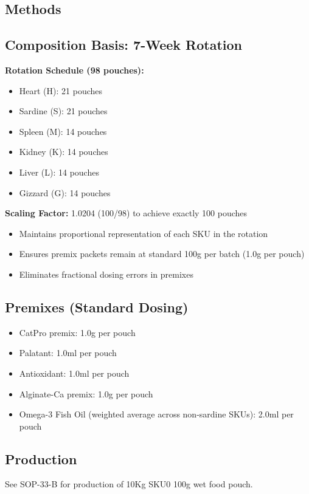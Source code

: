\subsection*{Methods}

\subsection*{Composition Basis: 7-Week Rotation}

\textbf{Rotation Schedule (98 pouches):}
\begin{itemize}
\item Heart (H): 21 pouches
\item Sardine (S): 21 pouches
\item Spleen (M): 14 pouches
\item Kidney (K): 14 pouches
\item Liver (L): 14 pouches
\item Gizzard (G): 14 pouches
\end{itemize}
\textbf{Scaling Factor:} 1.0204 (100/98) to achieve exactly 100 pouches
\begin{itemize}
\item Maintains proportional representation of each SKU in the rotation
\item Ensures premix packets remain at standard 100g per batch (1.0g per pouch)
\item Eliminates fractional dosing errors in premixes 
\end{itemize}

\subsection*{Premixes (Standard Dosing)}
\begin{itemize}
\item CatPro premix: 1.0g per pouch
\item Palatant: 1.0ml per pouch
\item Antioxidant: 1.0ml per pouch
\item Alginate-Ca premix: 1.0g per pouch
\item Omega-3 Fish Oil (weighted average across non-sardine SKUs): 2.0ml per pouch
\end{itemize}

\subsection*{Production}
See SOP-33-B for production of 10Kg SKU0 100g wet food pouch. 

